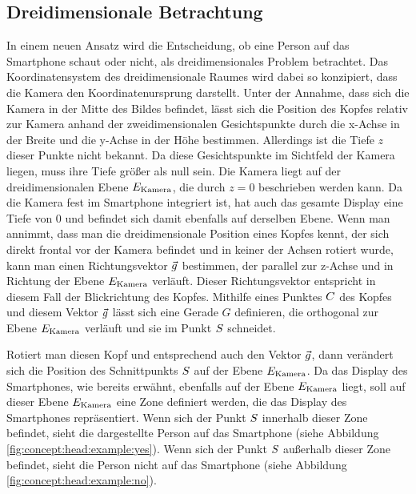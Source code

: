 \subsection{Dreidimensionale Betrachtung}\label{sec:concept:head:3d}

In einem neuen Ansatz wird die Entscheidung, ob eine Person auf das Smartphone schaut oder nicht, als dreidimensionales Problem betrachtet. Das Koordinatensystem des dreidimensionale Raumes wird dabei so konzipiert, dass die Kamera den Koordinatenursprung darstellt. Unter der Annahme, dass sich die Kamera in der Mitte des Bildes befindet, lässt sich die Position des Kopfes relativ zur Kamera anhand der zweidimensionalen Gesichtspunkte durch die x-Achse in der Breite und die y-Achse in der Höhe bestimmen. Allerdings ist die Tiefe $z$ dieser Punkte nicht bekannt. Da diese Gesichtspunkte im Sichtfeld der Kamera liegen, muss ihre Tiefe größer als null sein. Die Kamera liegt auf der dreidimensionalen Ebene $E_{\text{Kamera}}$, die durch $z = 0$ beschrieben werden kann. Da die Kamera fest im Smartphone integriert ist, hat auch das gesamte Display eine Tiefe von 0 und befindet sich damit ebenfalls auf derselben Ebene.
Wenn man annimmt, dass man die dreidimensionale Position eines Kopfes kennt, der sich direkt frontal vor der Kamera befindet und in keiner der Achsen rotiert wurde, kann man einen Richtungsvektor $\vec{g}$ bestimmen, der parallel zur z-Achse und in Richtung der Ebene $E_{\text{Kamera}}$ verläuft. Dieser Richtungsvektor entspricht in diesem Fall der Blickrichtung des Kopfes. Mithilfe eines Punktes $C$ des Kopfes und diesem Vektor $\vec{g}$ lässt sich eine Gerade $G$ definieren, die orthogonal zur Ebene $E_{\text{Kamera}}$ verläuft und sie im Punkt $S$ schneidet. 

Rotiert man diesen Kopf und entsprechend auch den Vektor $\vec{g}$, dann verändert sich die Position des Schnittpunkts $S$ auf der Ebene $E_{\text{Kamera}}$. Da das Display des Smartphones, wie bereits erwähnt, ebenfalls auf der Ebene $E_{\text{Kamera}}$ liegt, soll auf dieser Ebene $E_{\text{Kamera}}$ eine Zone definiert werden, die das Display des Smartphones repräsentiert. Wenn sich der Punkt $S$ innerhalb dieser Zone befindet, sieht die dargestellte Person auf das Smartphone (siehe Abbildung \ref{fig:concept:head:example:yes}). Wenn sich der Punkt $S$ außerhalb dieser Zone befindet, sieht die Person nicht auf das Smartphone (siehe Abbildung \ref{fig:concept:head:example:no}).

